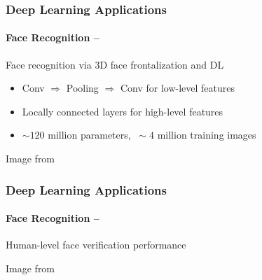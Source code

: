 \documentclass[xetex,professionalfont]{beamer}
\begin{document}

\begin{frame}
\frametitle{Deep Learning Applications}
\framesubtitle{Face Recognition -- \cite{taigman2013}}

Face recognition via 3D face frontalization and DL
\begin{itemize}
    \item Conv $\Rightarrow$ Pooling $\Rightarrow$ Conv for low-level features
    \item Locally connected layers for high-level features %
    \item $\sim120$ million parameters, $~\sim4$ million training images
\end{itemize}

\bigskip
\begin{center}
    {\centering Image from \cite{taigman2013}}
\end{center}

\end{frame}


\begin{frame}
\frametitle{Deep Learning Applications}
\framesubtitle{Face Recognition -- \cite{taigman2013}}

Human-level face verification performance %

\bigskip
\begin{center}
    {\centering Image from \cite{taigman2013}}
\end{center}

\end{frame}
\end{document}
